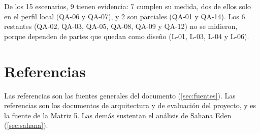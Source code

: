\documentclass[11pt,letterpaper]{article}
\begin{document}
De los 15 escenarios, 9 tienen evidencia: 7 cumplen su medida, dos de ellos solo en el perfil local
(QA-06 y QA-07), y 2 son parciales (QA-01 y QA-14). Los 6 restantes (QA-02, QA-03, QA-05, QA-08, QA-09 y QA-12) no se midieron, porque dependen de partes que
quedan como diseño (L-01, L-03, L-04 y L-06).

\newpage
\section{Referencias}
\label{sec:referencias}

Las referencias \cite{enunciado,bass,cervantes,iso25010,iso29148,iso42010,clements,kruchten,martin} son las fuentes generales del documento
(\cref{sec:fuentes}). Las referencias \cite{sad,atam} son los documentos de arquitectura y de
evaluación del proyecto, y \cite{informe-medidas} es la fuente de la Matriz 5. Las demás sustentan
el análisis de Sahana Eden (\cref{sec:sahana}).
\end{document}
